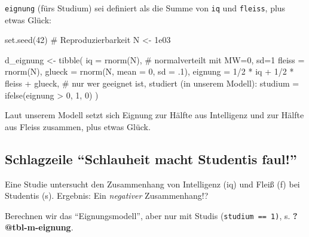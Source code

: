 \documentclass[
  a4paper,
  DIV=11]{scrreprt}
\newenvironment{Shaded}{\begin{snugshade}}{\end{snugshade}}
\newcommand{\AttributeTok}[1]{\textcolor[rgb]{0.40,0.45,0.13}{#1}}
\newcommand{\CommentTok}[1]{\textcolor[rgb]{0.37,0.37,0.37}{#1}}
\newcommand{\DecValTok}[1]{\textcolor[rgb]{0.68,0.00,0.00}{#1}}
\newcommand{\FloatTok}[1]{\textcolor[rgb]{0.68,0.00,0.00}{#1}}
\newcommand{\FunctionTok}[1]{\textcolor[rgb]{0.28,0.35,0.67}{#1}}
\newcommand{\NormalTok}[1]{\textcolor[rgb]{0.00,0.23,0.31}{#1}}
\newcommand{\OtherTok}[1]{\textcolor[rgb]{0.00,0.23,0.31}{#1}}
\newcommand{\SpecialCharTok}[1]{\textcolor[rgb]{0.37,0.37,0.37}{#1}}
\theoremstyle{definition}
\theoremstyle{remark}
\begin{document}
\texttt{eignung} (fürs Studium) sei definiert als die Summe von
\texttt{iq} und \texttt{fleiss}, plus etwas Glück:

\begin{Shaded}
\begin{Highlighting}[]
\FunctionTok{set.seed}\NormalTok{(}\DecValTok{42}\NormalTok{)  }\CommentTok{\# Reproduzierbarkeit}
\NormalTok{N }\OtherTok{\textless{}{-}} \FloatTok{1e03}  

\NormalTok{d\_eignung }\OtherTok{\textless{}{-}}
\FunctionTok{tibble}\NormalTok{(}
  \AttributeTok{iq =} \FunctionTok{rnorm}\NormalTok{(N),  }\CommentTok{\# normalverteilt mit MW=0, sd=1}
  \AttributeTok{fleiss =} \FunctionTok{rnorm}\NormalTok{(N),}
  \AttributeTok{glueck =} \FunctionTok{rnorm}\NormalTok{(N, }\AttributeTok{mean =} \DecValTok{0}\NormalTok{, }\AttributeTok{sd =}\NormalTok{ .}\DecValTok{1}\NormalTok{),}
  \AttributeTok{eignung =} \DecValTok{1}\SpecialCharTok{/}\DecValTok{2} \SpecialCharTok{*}\NormalTok{ iq }\SpecialCharTok{+} \DecValTok{1}\SpecialCharTok{/}\DecValTok{2} \SpecialCharTok{*}\NormalTok{ fleiss }\SpecialCharTok{+}\NormalTok{ glueck,}
  \CommentTok{\# nur wer geeignet ist, studiert (in unserem Modell):}
  \AttributeTok{studium =} \FunctionTok{ifelse}\NormalTok{(eignung }\SpecialCharTok{\textgreater{}} \DecValTok{0}\NormalTok{, }\DecValTok{1}\NormalTok{, }\DecValTok{0}\NormalTok{) }
\NormalTok{  )}
\end{Highlighting}
\end{Shaded}

Laut unserem Modell setzt sich Eignung zur Hälfte aus Intelligenz und
zur Hälfte aus Fleiss zusammen, plus etwas Glück.

\hypertarget{schlagzeile-schlauheit-macht-studentis-faul}{%
\subsection{Schlagzeile ``Schlauheit macht Studentis
faul!''}\label{schlagzeile-schlauheit-macht-studentis-faul}}

Eine Studie untersucht den Zusammenhang von Intelligenz (iq) und Fleiß
(f) bei Studentis (s). Ergebnis: Ein \emph{negativer} Zusammenhang!?

Berechnen wir das ``Eignungsmodell'', aber nur mit Studis
(\texttt{studium\ ==\ 1)}, s. \textbf{?@tbl-m-eignung}.
\end{document}
